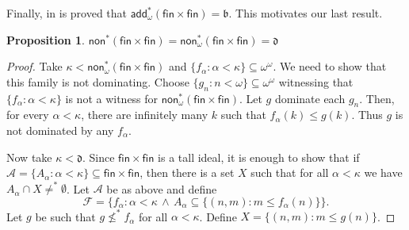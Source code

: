 \documentclass{amsart}
\theoremstyle{definition}
\newtheorem{proposition}[theorem]{Proposition}
\theoremstyle{remark}
\numberwithin{equation}{section}
\newcommand{\fin}{\mathsf{fin}}
\newcommand{\add}{\mathsf{add}}
\newcommand{\non}{\mathsf{non}}
\begin{document}
Finally, in \cite{poke} is proved that $\add^*_\omega(\fin\times \fin) =\mathfrak{b}$. This motivates our last result.

\begin{proposition}
    $\non^*(\fin\times \fin)=\non^*_\omega(\fin\times \fin) =\mathfrak{d}$
\end{proposition}
\begin{proof}
Take $\kappa<\non^*_\omega(\fin\times\fin)$ and $\{f_\alpha:\alpha<\kappa\}\subseteq \omega^\omega$. 
We need to show that this family is not dominating.  
Choose $\{g_n:n<\omega\}\subseteq \omega^\omega$ witnessing that $\{f_\alpha:\alpha<\kappa\}$ is not a witness for $\non^*_\omega(\fin\times\fin)$.  
Let $g$ dominate each $g_n$.  
Then, for every $\alpha<\kappa$, there are infinitely many $k$ such that $f_\alpha(k)\le g(k)$.
Thus $g$ is not dominated by any $f_\alpha$.

Now take $\kappa<\mathfrak{d}$.  
Since $\fin\times\fin$ is a tall ideal, it is enough to show that if $\mathcal{A}=\{A_\alpha:\alpha<\kappa\}\subseteq\fin\times\fin$, then there is a set $X$ such that for all $\alpha<\kappa$ we have $A_\alpha\cap X\neq^*\emptyset$.  
Let $\mathcal{A}$ be as above and define
\[
\mathcal{F}
=\bigl\{
f_\alpha:\alpha<\kappa \,\wedge\, 
A_\alpha\subseteq \{(n,m): m\le f_\alpha(n)\}
\bigr\}.
\]
Let $g$ be such that $g\nleq^* f_\alpha$ for all $\alpha<\kappa$.  
Define $X=\{(n,m): m\le g(n)\}$.
\end{proof}

\nocite{*}



\end{document}
